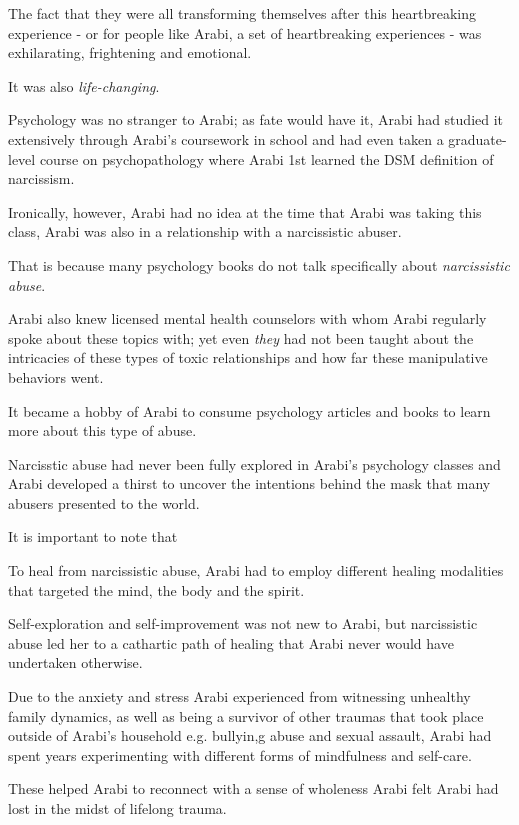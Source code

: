 \documentclass[oneside]{book}
\numberwithin{equation}{section}
\begin{document}
The fact that they were all transforming themselves after this heartbreaking experience - or for people like Arabi, a set of heartbreaking experiences - was exhilarating, frightening and emotional.

It was also \textit{life-changing}.

%
Psychology was no stranger to Arabi; as fate would have it, Arabi had studied it extensively through Arabi's coursework in school and had even taken a graduate-level course on psychopathology where Arabi 1st learned the DSM definition of narcissism.

Ironically, however, Arabi had no idea at the time that Arabi was taking this class, Arabi was also in a relationship with a narcissistic abuser.

That is because many psychology books do not talk specifically about \textit{narcissistic abuse}.

%
Arabi also knew licensed mental health counselors with whom Arabi regularly spoke about these topics with; yet even \textit{they} had not been taught about the intricacies of these types of toxic relationships and how far these manipulative behaviors went.

It became a hobby of Arabi to consume psychology articles and books to learn more about this type of abuse.

Narcisstic abuse had never been fully explored in Arabi's psychology classes and Arabi developed a thirst to uncover the intentions behind the mask that many abusers presented to the world.

%
It is important to note that 

To heal from narcissistic abuse, Arabi had to employ different healing modalities that targeted the mind, the body and the spirit.

Self-exploration and self-improvement was not new to Arabi, but narcissistic abuse led her to a cathartic path of healing that Arabi never would have undertaken otherwise.

Due to the anxiety and stress Arabi experienced from witnessing unhealthy family dynamics, as well as being a survivor of other traumas that took place outside of Arabi's household e.g. bullyin,g abuse and sexual assault, Arabi had spent years experimenting with different forms of mindfulness and self-care.

These helped Arabi to reconnect with a sense of wholeness Arabi felt Arabi had lost in the midst of lifelong trauma.
\end{document}
